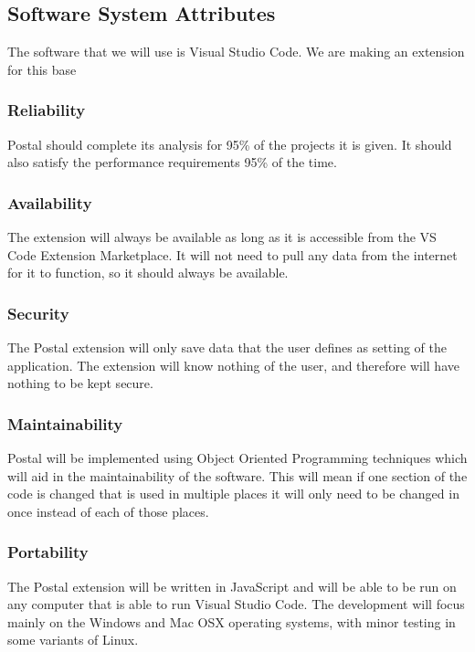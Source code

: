 \documentclass[letterpaper,10pt,titlepage,draftclsnofoot,onecolumn,onesided] {IEEEtran}
\begin{document}
\subsection{Software System Attributes}
The software that we will use is Visual Studio Code. We are making an extension for this base

\subsubsection{Reliability}
Postal should complete its analysis for 95\% of the projects it is given. It should also satisfy the performance requirements 95\% of the time.   

\subsubsection{Availability}
The extension will always be available as long as it is accessible from the VS Code Extension Marketplace. 
It will not need to pull any data from the internet for it to function, so it should always be available.

\subsubsection{Security}
The Postal extension will only save data that the user defines as setting of the application. 
The extension will know nothing of the user, and therefore will have nothing to be kept secure.

\subsubsection{Maintainability}
Postal will be implemented using Object Oriented Programming techniques which will aid in the maintainability of the software. 
This will mean if one section of the code is changed that is used in multiple places it will only need to be changed in once instead of each of those places.

\subsubsection{Portability}
The Postal extension will be written in JavaScript and will be able to be run on any computer that is able to run Visual Studio Code. 
The development will focus mainly on the Windows and Mac OSX operating systems, with minor testing in some variants of Linux.
\end{document}
